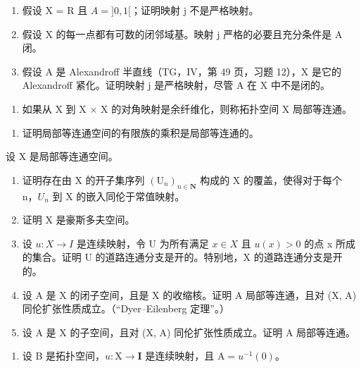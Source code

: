 \begin{enumerate}
\def\labelenumi{\alph{enumi})}
\item
  假设 X = R 且 \(A = ]0, 1[\)；证明映射 j 不是严格映射。
\item
  假设 X 的每一点都有可数的闭邻域基。映射 j 严格的必要且充分条件是 A 闭。
\item
  假设 A 是 Alexandroff 半直线（TG，IV，第 49 页，习题 12），X 是它的 Alexandroff 紧化。证明映射 j 是严格映射，尽管 A 在 X 中不是闭的。
\end{enumerate}

\begin{enumerate}
\def\labelenumi{\arabic{enumi})}
\setcounter{enumi}{17}
\tightlist
\item
如果从 X 到 X × X 的对角映射是余纤维化，则称拓扑空间 X 局部等连通。
\end{enumerate}

\begin{enumerate}
\def\labelenumi{\alph{enumi})}
\tightlist
\item
  证明局部等连通空间的有限族的乘积是局部等连通的。
\end{enumerate}

设 X 是局部等连通空间。

\begin{enumerate}
\def\labelenumi{\alph{enumi})}
\setcounter{enumi}{1}
\item
  证明存在由 X 的开子集序列 \((\mathrm{U}_{n})_{n\in\mathbf{N}}\) 构成的 X 的覆盖，使得对于每个 n，\(U_{n}\) 到 X 的嵌入同伦于常值映射。
\item
  证明 X 是豪斯多夫空间。
\item
  设 \(u: X \to I\) 是连续映射，令 U 为所有满足 \(x \in X\) 且 \(u(x) > 0\) 的点 x 所成的集合。证明 U 的道路连通分支是开的。特别地，X 的道路连通分支是开的。
\item
  设 A 是 X 的闭子空间，且是 X 的收缩核。证明 A 局部等连通，且对 (X, A) 同伦扩张性质成立。（“Dyer–Eilenberg 定理”。）
\item
  设 A 是 X 的子空间，且对 (X, A) 同伦扩张性质成立。证明 A 局部等连通。
\end{enumerate}

\begin{enumerate}
\def\labelenumi{\arabic{enumi})}
\setcounter{enumi}{18}
\tightlist
\item
  设 B 是拓扑空间，\(u \colon \mathrm{X} \to \mathbf{I}\) 是连续映射，且 \(\mathrm{A} = u^{-1}(0)\)。
\end{enumerate}

